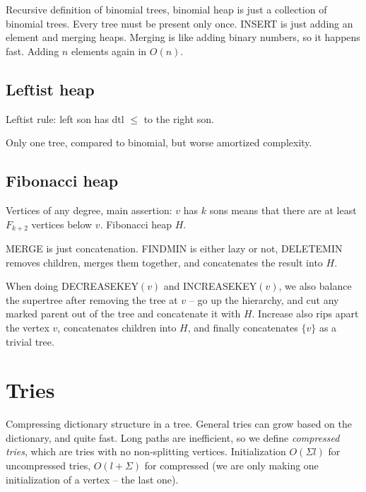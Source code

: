 Recursive definition of binomial trees, binomial heap is just a collection of
binomial trees. Every tree must be present only once. INSERT is just adding
an element and merging heaps. Merging is like adding binary numbers, so it happens
fast. Adding $n$ elements again in $O(n)$.

\subsection{Leftist heap}


Leftist rule: left son has dtl $≤$ to the right son.

Only one tree, compared to binomial, but worse amortized complexity.

\subsection{Fibonacci heap}

Vertices of any degree, main assertion: $v$ has $k$ sons means that there are
at least $F_{k+2}$ vertices below $v$. Fibonacci heap $H$.

MERGE is just concatenation. FINDMIN is either lazy or not, DELETEMIN removes
children, merges them together, and concatenates the result into $H$.

When doing DECREASEKEY$(v)$ and INCREASEKEY$(v)$, we also balance the
supertree after removing the tree at $v$ -- go up the hierarchy, and
cut any marked parent out of the tree and concatenate it with
$H$. Increase also rips apart the vertex $v$, concatenates children
into $H$, and finally concatenates $\{v\}$ as a trivial tree.

\section{Tries}

Compressing dictionary structure in a tree. General tries can grow
based on the dictionary, and quite fast. Long paths are inefficient,
so we define {\it compressed tries}, which are tries with no
non-splitting vertices. Initialization $O(Σl)$ for uncompressed tries,
$O(l + Σ)$ for compressed (we are only making one initialization of a
vertex -- the last one).



